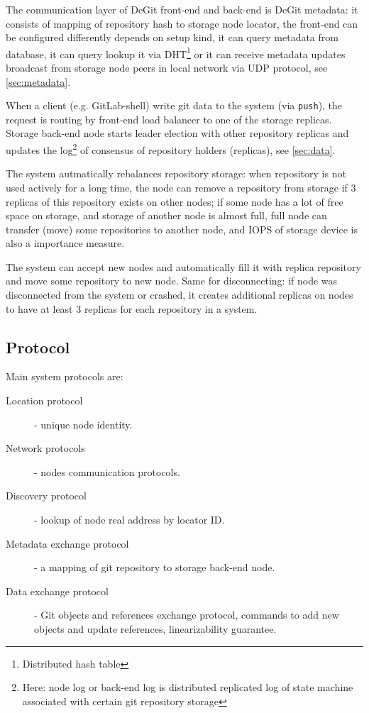 \documentclass[acmlarge, screen, nonacm]{acmart}
\newcommand{\code}[1]{\texttt{#1}}
\begin{document}
The communication layer of DeGit front-end and back-end is DeGit metadata: it consists of mapping
of repository hash to storage node locator, the front-end can be configured differently depends on
setup kind, it can query metadata from database, it can query lookup it via DHT\footnote{Distributed hash table}
or it can receive metadata updates broadcast from storage node peers in local network via UDP protocol,
see \ref{sec:metadata}.

When a client (e.g. GitLab-shell) write git data to the system (via \code{push}), the request is routing
by front-end load balancer to one of the storage replicas.
Storage back-end node starts leader election with other repository replicas and updates the log\footnote{Here: node log
or back-end log is distributed replicated log of state machine associated with certain git repository storage}
of consensus of repository holders (replicas), see \ref{sec:data}.

The system autmatically rebalances repository storage: when repository is not used actively for a
long time, the node can remove a repository from storage if 3 replicas of this repository exists on other nodes;
if some node has a lot of free space on storage, and storage of another node is almost full,
full node can transfer (move) some repositories to another node, and IOPS of storage device is also
a importance measure.

The system can accept new nodes and automatically fill it with replica repository and
move some repository to new node. Same for disconnecting: if node was disconnected from the system or crashed,
it creates additional replicas on nodes to have at least 3 replicas for each repository in a system.

\subsection{Protocol}
Main system protocols are:
\begin{description}
  \item[Location protocol] - unique node identity.
  \item[Network protocols] - nodes communication protocols.
  \item[Discovery protocol] - lookup of node real address by locator ID.
  \item[Metadata exchange protocol] - a mapping of git repository to storage back-end node.
  \item[Data exchange protocol] - Git objects and references exchange protocol,
    commands to add new objects and update references, linearizability guarantee.
\end{description}
\end{document}

